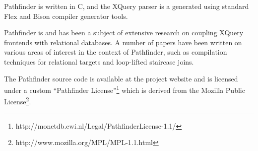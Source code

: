 Pathfinder is written in C, and the XQuery parser is a generated using standard
Flex and Bison compiler generator tools.

Pathfinder is and has been a subject of extensive research on coupling XQuery
frontends with relational databases. A number of papers have been written 
on various areas of interest in the context of Pathfinder, such as compilation
techniques for relational targets\cite{pathfinder_comptech} and loop-lifted
staircase joins\cite{pathfinder_staircase}.

The Pathfinder source code is available at the project
website\cite{pathfinderHome} and is licensed under a custom ``Pathfinder
License''\footnote{http://monetdb.cwi.nl/Legal/PathfinderLicense-1.1/} which is
derived from the Mozilla Public License\footnote{http://www.mozilla.org/MPL/MPL-1.1.html}.
